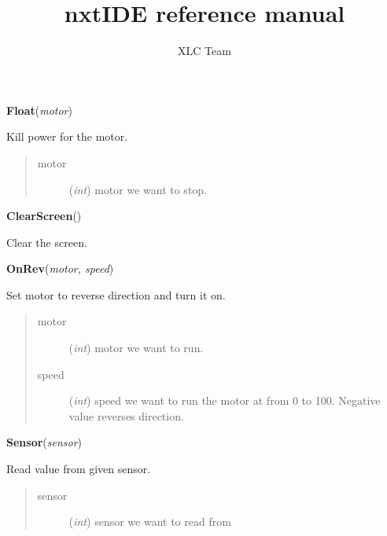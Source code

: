 \documentclass[10pt,a4paper]{article}
\title{nxtIDE reference manual}
\author{XLC Team}
\date{}
\begin{document}
\maketitle

\vspace{6pt}
{\bf Float}({\it motor}) 
    
    Kill power for the motor.


    

\begin{quote}
    \begin{description}
        
\item[motor] ({\emph{int}}) motor we want to stop.

    \end{description}
\end{quote}

 

\vspace{6pt}
{\bf ClearScreen}({\it }) 
    
    Clear the screen.


 

\vspace{6pt}
{\bf OnRev}({\it motor, speed}) 
    
    Set motor to reverse direction and turn it on.
    


    

\begin{quote}
    \begin{description}
        
\item[motor] ({\emph{int}}) motor we want to run.

\item[speed] ({\emph{int}}) speed we want to run the motor at from 0 to 100. Negative value reverses direction.

    \end{description}
\end{quote}

 

\vspace{6pt}
{\bf Sensor}({\it sensor}) 
    
    Read value from given sensor.
    

    

\begin{quote}
    \begin{description}
        
\item[sensor] ({\emph{int}}) sensor we want to read from

    \end{description}
\end{quote}
\end{document}
